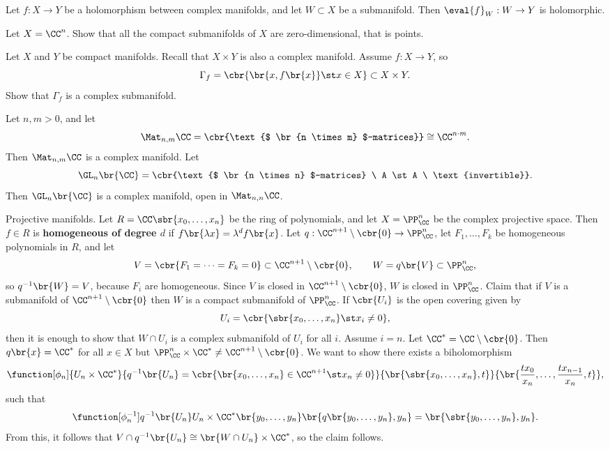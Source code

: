 \begin{example}
Let $ f : X \to Y $ be a holomorphism between complex manifolds, and let $ W \subset X $ be a submanifold. Then $ \eval{f}_W : W \to Y $ is holomorphic.
\end{example}

\begin{exercise}
Let $ X = \CC^n $. Show that all the compact submanifolds of $ X $ are zero-dimensional, that is points.
\end{exercise}

\begin{exercise}
Let $ X $ and $ Y $ be compact manifolds. Recall that $ X \times Y $ is also a complex manifold. Assume $ f : X \to Y $, so
$$ \Gamma_f = \cbr{\br{x, f\br{x}} \st x \in X} \subset X \times Y. $$
Show that $ \Gamma_f $ is a complex submanifold.
\end{exercise}

\begin{example}
Let $ n, m > 0 $, and let
$$ \Mat_{n, m} \CC = \cbr{\text{$ \br{n \times m} $-matrices}} \cong \CC^{n \cdot m}. $$
Then $ \Mat_{n, m} \CC $ is a complex manifold. Let
$$ \GL_n\br{\CC} = \cbr{\text{$ \br{n \times n} $-matrices} \ A \st A \ \text{invertible}}. $$
Then $ \GL_n\br{\CC} $ is a complex manifold, open in $ \Mat_{n, n} \CC $.
\end{example}

\pagebreak

\begin{example}
Projective manifolds. Let $ R = \CC\sbr{x_0, \dots, x_n} $ be the ring of polynomials, and let $ X = \PP_\CC^n $ be the complex projective space. Then $ f \in R $ is \textbf{homogeneous of degree $ d $} if $ f\br{\lambda x} = \lambda^df\br{x} $. Let $ q : \CC^{n + 1} \setminus \cbr{0} \to \PP_\CC^n $, let $ F_1, \dots, F_k $ be homogeneous polynomials in $ R $, and let
$$ V = \cbr{F_1 = \dots = F_k = 0} \subset \CC^{n + 1} \setminus \cbr{0}, \qquad W = q\br{V} \subset \PP_\CC^n, $$
so $ q^{-1}\br{W} = V $, because $ F_i $ are homogeneous. Since $ V $ is closed in $ \CC^{n + 1} \setminus \cbr{0} $, $ W $ is closed in $ \PP_\CC^n $. Claim that if $ V $ is a submanifold of $ \CC^{n + 1} \setminus \cbr{0} $ then $ W $ is a compact submanifold of $ \PP_\CC^n $. If $ \cbr{U_i} $ is the open covering given by
$$ U_i = \cbr{\sbr{x_0, \dots, x_n} \st x_i \ne 0}, $$
then it is enough to show that $ W \cap U_i $ is a complex submanifold of $ U_i $ for all $ i $. Assume $ i = n $. Let $ \CC^* = \CC \setminus \cbr{0} $. Then $ q\br{x} = \CC^* $ for all $ x \in X $ but $ \PP_\CC^n \times \CC^* \ne \CC^{n + 1} \setminus \cbr{0} $. We want to show there exists a biholomorphism
$$ \function[\phi_n]{U_n \times \CC^*}{q^{-1}\br{U_n} = \cbr{\br{x_0, \dots, x_n} \in \CC^{n + 1} \st x_n \ne 0}}{\br{\sbr{x_0, \dots, x_n}, t}}{\br{\dfrac{tx_0}{x_n}, \dots, \dfrac{tx_{n - 1}}{x_n}, t}}, $$
such that
$$ \function[\phi_n^{-1}]{q^{-1}\br{U_n}}{U_n \times \CC^*}{\br{y_0, \dots, y_n}}{\br{q\br{y_0, \dots, y_n}, y_n} = \br{\sbr{y_0, \dots, y_n}, y_n}}. $$
From this, it follows that $ V \cap q^{-1}\br{U_n} \cong \br{W \cap U_n} \times \CC^* $, so the claim follows.
\end{example}

